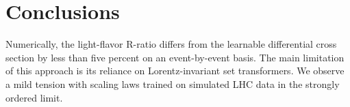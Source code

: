 \section{Conclusions}\label{sec:conclusions}

Numerically, the light-flavor R-ratio differs from the learnable
differential cross section by less than five percent on an
event-by-event basis. The main limitation of this approach is its
reliance on Lorentz-invariant set transformers. We observe a mild
tension with scaling laws trained on simulated LHC data in the strongly
ordered limit.

